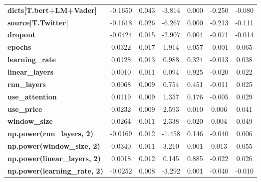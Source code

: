 \begin{center}
\begin{tabular}{lcccccc}
\textbf{dicts[T.bert+LM+Vader]}      &      -0.1650  &        0.043     &    -3.814  &         0.000        &       -0.250    &       -0.080     \\
\textbf{source[T.Twitter]}           &      -0.1618  &        0.026     &    -6.267  &         0.000        &       -0.213    &       -0.111     \\
\textbf{dropout}                     &      -0.0424  &        0.015     &    -2.907  &         0.004        &       -0.071    &       -0.014     \\
\textbf{epochs}                      &       0.0322  &        0.017     &     1.914  &         0.057        &       -0.001    &        0.065     \\
\textbf{learning\_rate}              &       0.0128  &        0.013     &     0.988  &         0.324        &       -0.013    &        0.038     \\
\textbf{linear\_layers}              &       0.0010  &        0.011     &     0.094  &         0.925        &       -0.020    &        0.022     \\
\textbf{rnn\_layers}                 &       0.0068  &        0.009     &     0.754  &         0.451        &       -0.011    &        0.025     \\
\textbf{use\_attention}              &       0.0119  &        0.009     &     1.357  &         0.176        &       -0.005    &        0.029     \\
\textbf{use\_price}                  &       0.0232  &        0.009     &     2.593  &         0.010        &        0.006    &        0.041     \\
\textbf{window\_size}                &       0.0264  &        0.011     &     2.338  &         0.020        &        0.004    &        0.049     \\
\textbf{np.power(rnn\_layers, 2)}    &      -0.0169  &        0.012     &    -1.458  &         0.146        &       -0.040    &        0.006     \\
\textbf{np.power(window\_size, 2)}   &       0.0340  &        0.011     &     3.210  &         0.001        &        0.013    &        0.055     \\
\textbf{np.power(linear\_layers, 2)} &       0.0018  &        0.012     &     0.145  &         0.885        &       -0.022    &        0.026     \\
\textbf{np.power(learning\_rate, 2)} &      -0.0252  &        0.008     &    -3.292  &         0.001        &       -0.040    &       -0.010     \\

\end{tabular}
\end{center}
